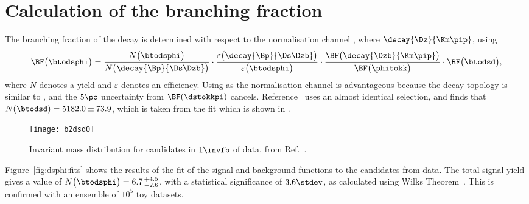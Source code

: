 \section{Calculation of the branching fraction}
\label{sec:dsphi:bf}
The branching fraction of the decay \btodsphi is determined with respect to the normalisation
channel \btodsd, where $\decay{\Dz}{\Km\pip}$, using
\begin{equation}
  \BF\big(\btodsphi\big) =
  \frac{N\big(\btodsphi\big)}{N\big(\decay{\Bp}{\Ds\Dzb}\big)}
  \cdot
  \frac{\varepsilon\big(\decay{\Bp}{\Ds\Dzb}\big)}{\varepsilon\big(\btodsphi\big)}
  \cdot
  \frac{\BF\big(\decay{\Dzb}{\Km\pip}\big)}{\BF\big(\phitokk\big)}
  \cdot
  \BF\big(\btodsd\big)
  ,
  \label{eq:dsphi:bf}
\end{equation}
where $N$ denotes a yield and $\varepsilon$ denotes an efficiency.
Using \btodsd as the normalisation channel is advantageous because the decay topology is similar to
\btodsphi, and the $5\pc$ uncertainty from $\BF(\dstokkpi)$ cancels.
Reference~\cite{LHCb-CONF-2012-009} uses an almost identical selection, and finds that
$N(\btodsd) = 5182.0\pm73.9$, which is taken from the fit which is shown in
.



\begin{figure}
  \begin{center}
    \texttt{[image: b2dsd0]}
    \caption[Fit to the normalisation channel \btodsd]
    {
      Invariant mass distribution for \btodsd candidates in $1\invfb$ of \lhcb data, from
      Ref.~\protect\cite{LHCb-CONF-2012-009}.
    }
    \label{fig:dsphi:dsd}
  \end{center}
\end{figure}




Figure~\ref{fig:dsphi:fits} shows the results of the fit of the signal and background functions to
the \btodsphi candidates from data.
The total signal yield gives a value of $N\big(\btodsphi\big)=6.7\,^{+4.5}_{-2.6}$, with a
statistical significance of $3.6\stdev$, as calculated using Wilks Theorem~\cite{wilks1938}.
This is confirmed with an ensemble of $10^5$ toy datasets.

